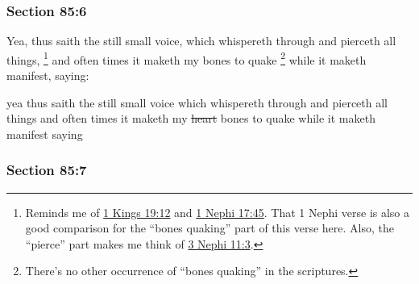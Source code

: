 
	\subsubsection{Section 85:6} %
		\label{DC85-6}

		Yea, thus saith the still small voice, which whispereth through and pierceth all things,%
			\footnote{%
				Reminds me of \hyperref[1KINGS-19-12]{1 Kings 19:12} and \hyperref[1NEPHI-17-45]{1 Nephi 17:45}. That 1 Nephi verse is also a good comparison for the ``bones quaking'' part of this verse here. Also, the ``pierce'' part makes me think of \hyperref[3NEPHI-11-3]{3 Nephi 11:3}.
				}
		and often times it maketh my bones to quake%
			\footnote{%
				There's no other occurrence of ``bones quaking'' in the scriptures.
				}
		while it maketh manifest, saying:

		\begin{framed}
		\scriptsize
			\begin{compactdesc}
				\item[JSP] yea thus saith the still small voice which whispereth through and pierceth all things and often times it maketh my \sout{heart} bones to quake while it maketh manifest saying
			\end{compactdesc}
		\end{framed}

	\subsubsection{Section 85:7} %
		\label{DC85-7}

